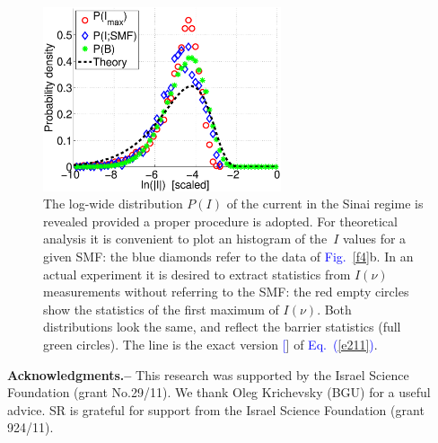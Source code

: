 \documentclass[aps,prl,floats,floatfix,twocolumn]{revtex4}
\newcommand{\Eq}[1]{\textcolor{blue}{Eq.\!\!~(\ref{#1})}}
\newcommand{\Fig}[1]{\textcolor{blue}{Fig.}\!\!~\ref{#1}}
\renewcommand{\cite}[1]{\textcolor{blue}{[\onlinecite{#1}}]} %
\begin{document}
\begin{figure}
\includegraphics[width=7cm]{PlnI.eps}

\caption{The log-wide distribution $P(I)$ of the current 
in the Sinai regime is revealed provided a proper procedure 
is adopted. For theoretical analysis it is convenient 
to plot an histogram of the~$I$ values for a given SMF:
the blue diamonds refer to the data of \Fig{f4}b.  
%
In an actual experiment it is desired to extract
statistics from $I(\nu)$ measurements without 
referring to the SMF: the red empty circles 
show the statistics of the first maximum of $I(\nu)$.    
%
Both distributions look the same, and reflect 
the barrier statistics (full green circles). 
The line is the exact version \cite{SM} of \Eq{e211}.}

\label{f5}
\end{figure}


\clearpage


{\bf Acknowledgments.-- }
%
This research was supported by the Israel Science Foundation (grant No.29/11).
We thank Oleg Krichevsky (BGU) for a useful advice. SR is grateful for support from
the Israel Science Foundation (grant 924/11).
\end{document}
